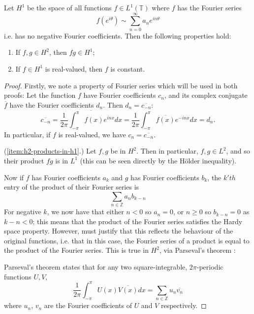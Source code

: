 \documentclass[../main.tex]{subfiles}
\begin{document}
\begin{lemma}
\label{thm:h1-properties}
  Let $H^1$ be the space of all functions $f \in L^1(\mathbb{T})$ where $f$ has
  the Fourier series
  $$f(e^{i \theta}) \sim \sum_{n=0}^\infty a_n e^{i n \theta}$$
  i.e. has no negative Fourier coefficients. Then the following properties hold:
  \begin{enumerate}
    \item\label{item:h2-products-in-h1} If $f, g \in H^2$, then $fg \in H^1$;
    \item\label{item:f-h1-const} If $f \in H^1$ is real-valued, then $f$ is constant.
  \end{enumerate}
\end{lemma}
\begin{proof}
  Firstly, we note a property of Fourier series which will be used in both proofs:
  Let the function $f$ have Fourier coefficients $c_n$, and its complex conjugate
  $\overline{f}$ have the Fourier coefficients $d_n$. Then $d_n = \overline{c_{-n}}:$
  \begin{equation}
  \label{eqn:fourier-conjugates}
    \overline{c_{-n}} = \overline{\frac{1}{2\pi} \int_{-\pi}^{\pi}  f(x) e^{inx} dx} 
		    = \frac{1}{2\pi} \int_{-\pi}^{\pi} \overline{f(x)} e^{-inx} dx
        = d_n.
  \end{equation}
  In particular, if $f$ is real-valued, we have $c_n = \overline{c_{-n}}$.

  (\ref{item:h2-products-in-h1}.) Let $f, g$ be in $H^2$. Then in particular, $f,
  g \in L^2$, and so their product $fg$ is in $L^1$ (this can be seen
  directly by the H\"older inequality).

  Now if $f$ has Fourier coefficients $a_k$ and $g$ has Fourier coefficients $b_k$,
  the $k'th$ entry of the product of their Fourier series is
  \begin{equation}
  \label{eqn:prod-fourier-series}
    \sum_{n \in \mathbb{Z}} a_n b_{k-n}
  \end{equation}
  For negative $k$, 
  we now have that either $n < 0$ so $a_n = 0$, or $n \geq 0$ so $b_{k-n} = 0$
  as $k-n < 0$; this means that the product of the Fourier series satisfies
  the Hardy space property. However, must justify that this reflects the behaviour
  of the original functions, i.e. that in this case, the Fourier series of a product
  is equal to the product of the Fourier series. This is true in $H^2$, via
  Parseval's theorem \cite{halmos1982hilbert}:
  
  Parseval's theorem states that for any two square-integrable, $2\pi$-periodic functions $U, V$,
  $$\frac{1}{2\pi} \int_{-\pi}^{\pi} U(x)\overline{V(x)} dx = \sum_{n \in \mathbb{Z}}u_n \overline{v_n}$$
  where $u_n$, $v_n$ are the Fourier coefficients of $U$ and $V$ respectively.


\end{proof}
\end{document}
